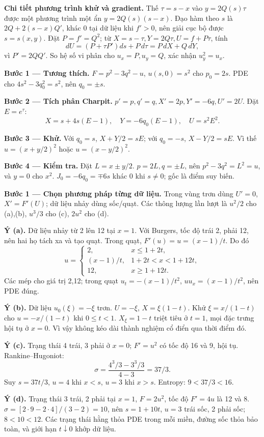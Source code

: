 \textbf{Chi tiết phương trình khử và gradient.} Thế $\tau=s-x$ vào $y=2Q(s)\tau$ được một phương trình một ẩn $y=2Q(s)(s-x)$. Đạo hàm theo $s$ là $2Q+2(s-x)Q'$, khác $0$ tại dữ liệu khi $f'>0$, nên giải cục bộ được $s=s(x,y)$. Đặt $P=f'=Q^2$; từ $X=s-\tau,Y=2Q\tau,U=f+P\tau$, tính
\[dU=(P+\tau P')ds+P\,d\tau=P\,dX+Q\,dY,\]
vì $P'=2QQ'$. So hệ số vi phân cho $u_x=P,u_y=Q$, xác nhận $u_y^2=u_x$.

\textbf{Bước 1 — Tương thích.} $F=p^2-3q^2-u$, $u(s,0)=s^2$ cho $p_0=2s$. PDE cho $4s^2-3q_0^2=s^2$, nên $q_0=\pm s$.

\textbf{Bước 2 — Tích phân Charpit.} $p'=p,q'=q,X'=2p,Y'=-6q,U'=2U$. Đặt $E=e^\tau$:
\[X=s+4s(E-1),\quad Y=-6q_0(E-1),\quad U=s^2E^2.\]

\textbf{Bước 3 — Khử.} Với $q_0=s$, $X+Y/2=sE$; với $q_0=-s$, $X-Y/2=sE$. Vì thế $u=(x+y/2)^2$ hoặc $u=(x-y/2)^2$.

\textbf{Bước 4 — Kiểm tra.} Đặt $L=x\pm y/2$. $p=2L,q=\pm L$, nên $p^2-3q^2=L^2=u$, và $y=0$ cho $x^2$. $J_0=-6q_0=\mp6s$ khác 0 khi $s\ne0$; gốc là điểm suy biến.

\textbf{Bước 1 — Chọn phương pháp từng dữ liệu.} Trong vùng trơn dùng $U'=0$, $X'=F'(U)$; dữ liệu nhảy dùng sốc/quạt. Các thông lượng lần lượt là $u^2/2$ cho (a),(b), $u^3/3$ cho (c), $2u^2$ cho (d).

\textbf{Ý (a).} Dữ liệu nhảy từ 2 lên 12 tại $x=1$. Với Burgers, tốc độ trái 2, phải 12, nên hai họ tách xa và tạo quạt. Trong quạt, $F'(u)=u=(x-1)/t$. Do đó
\[u=\begin{cases}2,&x\le1+2t,\\(x-1)/t,&1+2t<x<1+12t,\\12,&x\ge1+12t.\end{cases}\]
Các mép cho giá trị 2,12; trong quạt $u_t=-(x-1)/t^2$, $uu_x=(x-1)/t^2$, nên PDE đúng.

\textbf{Ý (b).} Dữ liệu $u_0(\xi)=-\xi$ trơn. $U=-\xi$, $X=\xi(1-t)$. Khử $\xi=x/(1-t)$ cho $u=-x/(1-t)$ khi $0\le t<1$. $X_\xi=1-t$ triệt tiêu ở $t=1$, mọi đặc trưng hội tụ ở $x=0$. Vì vậy không kéo dài thành nghiệm cổ điển qua thời điểm đó.

\textbf{Ý (c).} Trạng thái 4 trái, 3 phải ở $x=0$; $F'=u^2$ có tốc độ 16 và 9, hội tụ. Rankine–Hugoniot:
\[\sigma=\frac{4^3/3-3^3/3}{4-3}=37/3.\]
Suy $s=37t/3$, $u=4$ khi $x<s$, $u=3$ khi $x>s$. Entropy: $9<37/3<16$.

\textbf{Ý (d).} Trạng thái 3 trái, 2 phải tại $x=1$, $F=2u^2$, tốc độ $F'=4u$ là 12 và 8. $\sigma=[2\cdot9-2\cdot4]/(3-2)=10$, nên $s=1+10t$, $u=3$ trái sốc, 2 phải sốc; $8<10<12$. Các trạng thái hằng thỏa PDE trong mỗi miền, đường sốc thỏa bảo toàn, và giới hạn $t\downarrow0$ khớp dữ liệu.

